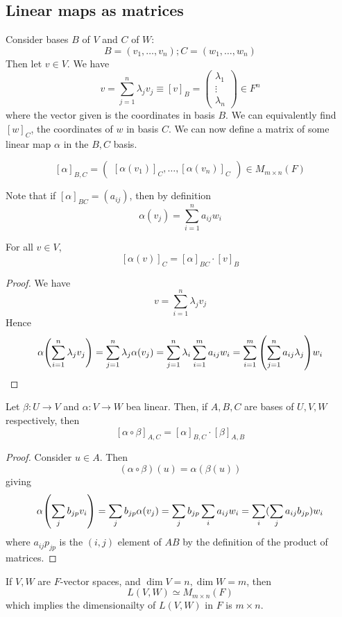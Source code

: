 \subsection{Linear maps as matrices}
Consider bases \( B \) of \( V \) and \( C \) of \( W \):
\[
	B = (v_1, \dots, v_n); C = (w_1, \dots, w_n)
\]
Then let \( v \in V \).
We have
\[
	v = \sum_{j=1}^n \lambda_j v_j \equiv [v]_B = \begin{pmatrix}
		\lambda_1 \\ \vdots \\ \lambda_n
	\end{pmatrix} \in F^n
\]
where the vector given is the coordinates in basis \( B \).
We can equivalently find \( [w]_C \), the coordinates of \( w \) in basis \( C \).
We can now define a matrix of some linear map \( \alpha \) in the \( B, C \) basis.
\begin{definition}
	\[
		[\alpha]_{B,C} = \begin{pmatrix}
			[\alpha(v_1)]_C, \dots, [\alpha(v_n)]_C
		\end{pmatrix} \in M_{m\times n}(F)
	\]
\end{definition}
Note that if \( [\alpha]_{BC} = (a_{ij}) \), then by definition
\[
	\alpha (v_j) = \sum_{i=1}^n a_{ij} w_i
\]
\begin{lemma}
	For all \( v \in V \),
	\[
		[\alpha(v)]_C = [\alpha]_{BC} \cdot [v]_{B}
	\]
\end{lemma}
\begin{proof}
	We have
	\[
		v = \sum_{i=1}^n \lambda_j v_j
	\]
	Hence
	\[
		\alpha\qty(\sum_{i=1}^n \lambda_j v_j) = \sum_{j=1}^n \lambda_j \alpha(v_j) = \sum_{j=1}^n \lambda_i \sum_{i=1}^m a_{ij} w_i = \sum_{i=1}^m \qty( \sum_{j=1}^n a_{ij} \lambda_j ) w_i
	\]
\end{proof}
\begin{lemma}
	Let \( \beta \colon U \to V \) and \( \alpha \colon V \to W \) bea linear.
	Then, if \( A,B,C \) are bases of \( U,V,W \) respectively, then
	\[
		[\alpha \circ \beta]_{A,C} = [\alpha]_{B,C} \cdot [\beta]_{A,B}
	\]
\end{lemma}
\begin{proof}
	Consider \( u \in A \).
	Then
	\[
		(\alpha \circ \beta)(u) = \alpha(\beta(u))
	\]
	giving
	\[
		\alpha\qty(\sum_j b_{jp} v_i) = \sum_j b_{jp} \alpha(v_j) = \sum_j b_{jp} \sum_i a_{ij} w_i = \sum_i ( \sum_j a_{ij} b_{jp} ) w_i
	\]
	where \( a_{ij} p_{jp} \) is the \( (i,j) \) element of \( AB \) by the definition of the product of matrices.
\end{proof}
\begin{proposition}
	If \( V, W \) are \( F \)-vector spaces, and \( \dim V = n, \dim W = m \), then
	\[
		L(V,W) \simeq M_{m \times n}(F)
	\]
	which implies the dimensionailty of \( L(V,W) \) in \( F \) is \( m \times n \).
\end{proposition}
